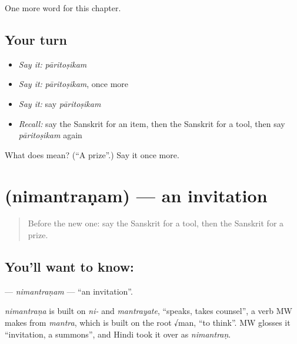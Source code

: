 \begin{grammarlens}[title={What you've built}]
One more word for this chapter.
\end{grammarlens}

\subsection*{Your turn}
\begin{itemize}
\raggedright
  \item \emph{Say it:} \emph{pāritoṣikam}
  \item \emph{Say it:} \emph{pāritoṣikam}, once more
  \item \emph{Say it:} say \emph{pāritoṣikam}
  \item \emph{Recall:} say the Sanskrit for an item, then the Sanskrit for a tool, then say \emph{pāritoṣikam} again
\end{itemize}

\begin{tcolorbox}[breakable,colback=teal!4,colframe=teal!35!black,title={Before you move on}]
What does  mean? (\textquotedblleft{}A prize\textquotedblright{}.) Say it once more.
\end{tcolorbox}
\section[\texorpdfstring{\sk{निमन्त्रणम्} (nimantraṇam)}{निमन्त्रणम् (nimantraṇam)}]{ (nimantraṇam) — an invitation}

\label{lesson:SA-C194-nimantranam}



\begin{quote}
Before the new one: say the Sanskrit for a tool, then the Sanskrit for a prize.
\end{quote}

\subsection*{You'll want to know: }
\textbf{} — \emph{nimantraṇam} — \textquotedblleft{}an invitation\textquotedblright{}.

\begin{cousinweb}
\emph{nimantraṇa} is built on \emph{ni-} and \emph{mantrayate}, \textquotedblleft{}speaks, takes counsel\textquotedblright{}, a verb MW makes from \emph{mantra}, which is built on the root √man, \textquotedblleft{}to think\textquotedblright{}. MW glosses it \textquotedblleft{}invitation, a summons\textquotedblright{}, and Hindi took it over as \emph{nimantraṇ}.
\end{cousinweb}

